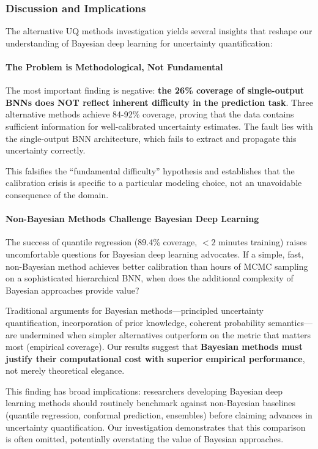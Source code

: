 \subsubsection{Discussion and Implications}

The alternative UQ methods investigation yields several insights that reshape our understanding of Bayesian deep learning for uncertainty quantification:

\paragraph{The Problem is Methodological, Not Fundamental}

The most important finding is negative: \textbf{the 26\% coverage of single-output BNNs does NOT reflect inherent difficulty in the prediction task}. Three alternative methods achieve 84-92\% coverage, proving that the data contains sufficient information for well-calibrated uncertainty estimates. The fault lies with the single-output BNN architecture, which fails to extract and propagate this uncertainty correctly.

This falsifies the ``fundamental difficulty'' hypothesis and establishes that the calibration crisis is specific to a particular modeling choice, not an unavoidable consequence of the domain.

\paragraph{Non-Bayesian Methods Challenge Bayesian Deep Learning}

The success of quantile regression (89.4\% coverage, $<2$ minutes training) raises uncomfortable questions for Bayesian deep learning advocates. If a simple, fast, non-Bayesian method achieves better calibration than hours of MCMC sampling on a sophisticated hierarchical BNN, when does the additional complexity of Bayesian approaches provide value?

Traditional arguments for Bayesian methods—principled uncertainty quantification, incorporation of prior knowledge, coherent probability semantics—are undermined when simpler alternatives outperform on the metric that matters most (empirical coverage). Our results suggest that \textbf{Bayesian methods must justify their computational cost with superior empirical performance}, not merely theoretical elegance.

This finding has broad implications: researchers developing Bayesian deep learning methods should routinely benchmark against non-Bayesian baselines (quantile regression, conformal prediction, ensembles) before claiming advances in uncertainty quantification. Our investigation demonstrates that this comparison is often omitted, potentially overstating the value of Bayesian approaches.

